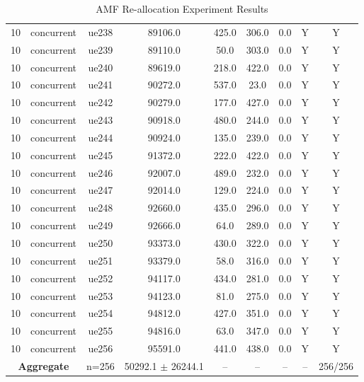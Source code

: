 \begin{table}[ht]
\begin{tabular}{|c|c|c|c|c|c|c|c|c|}
10 & concurrent & ue238 & 89106.0 & 425.0 & 306.0 & 0.0 & Y & Y \\
10 & concurrent & ue239 & 89110.0 & 50.0 & 303.0 & 0.0 & Y & Y \\
10 & concurrent & ue240 & 89619.0 & 218.0 & 422.0 & 0.0 & Y & Y \\
10 & concurrent & ue241 & 90272.0 & 537.0 & 23.0 & 0.0 & Y & Y \\
10 & concurrent & ue242 & 90279.0 & 177.0 & 427.0 & 0.0 & Y & Y \\
10 & concurrent & ue243 & 90918.0 & 480.0 & 244.0 & 0.0 & Y & Y \\
10 & concurrent & ue244 & 90924.0 & 135.0 & 239.0 & 0.0 & Y & Y \\
10 & concurrent & ue245 & 91372.0 & 222.0 & 422.0 & 0.0 & Y & Y \\
10 & concurrent & ue246 & 92007.0 & 489.0 & 232.0 & 0.0 & Y & Y \\
10 & concurrent & ue247 & 92014.0 & 129.0 & 224.0 & 0.0 & Y & Y \\
10 & concurrent & ue248 & 92660.0 & 435.0 & 296.0 & 0.0 & Y & Y \\
10 & concurrent & ue249 & 92666.0 & 64.0 & 289.0 & 0.0 & Y & Y \\
10 & concurrent & ue250 & 93373.0 & 430.0 & 322.0 & 0.0 & Y & Y \\
10 & concurrent & ue251 & 93379.0 & 58.0 & 316.0 & 0.0 & Y & Y \\
10 & concurrent & ue252 & 94117.0 & 434.0 & 281.0 & 0.0 & Y & Y \\
10 & concurrent & ue253 & 94123.0 & 81.0 & 275.0 & 0.0 & Y & Y \\
10 & concurrent & ue254 & 94812.0 & 427.0 & 351.0 & 0.0 & Y & Y \\
10 & concurrent & ue255 & 94816.0 & 63.0 & 347.0 & 0.0 & Y & Y \\
10 & concurrent & ue256 & 95591.0 & 441.0 & 438.0 & 0.0 & Y & Y \\
\multicolumn{2}{|c|}{\textbf{Aggregate}} & n=256 & 50292.1 $\pm$ 26244.1 & -- & -- & -- & -- & 256/256 \\
\hline
\end{tabular}
\caption{AMF Re-allocation Experiment Results}
\label{tab:amf_realloc}
\end{table}
